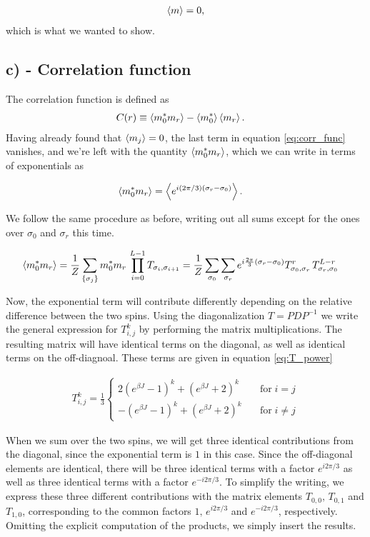 \documentclass[reprint,english,notitlepage,aps,nobalancelastpage,nofootinbib]{revtex4-1}
\newcommand{\sumstate}{\sum_{\{\sigma_j\}}}
\newcommand{\prodstate}{\prod_{i=0}^{L-1}}
\newcommand{\ebj}{e^{\beta J}}
\newcommand{\T}[1]{T_{\sigma_{#1},\sigma_{#1 + 1}}}
\newcommand{\mj}{m_j}
\begin{document}
\begin{align*}
	\expval{m} = 0,
\end{align*}
which is what we wanted to show.

\subsection*{c) - Correlation function}
The correlation function is defined as 
\begin{align} \label{eq:corr_func}
	C(r) &\equiv \expval{m_0^* m_r} - \expval{m_0^*}\expval{m_r}.
\end{align}
Having already found that $\expval{\mj}=0$, the last term in equation \eqref{eq:corr_func} vanishes, and we're left with the quantity $\expval{m_0^* m_r}$, which we can write in terms of exponentials as 

\begin{align*}
	\expval{m_0^* m_r} &= \expval{e^{i(2\pi/3)(\sigma_r - \sigma_0)}}.
\end{align*}

We follow the same procedure as before, writing out all sums except for the ones over $\sigma_0$ and $\sigma_r$ this time. 

\begin{align*}
	\expval{m_0^* m_r} &= \frac{1}{Z} \sumstate m_0^* m_r \, \prodstate \T{i} = \frac{1}{Z} \sum_{\sigma_0} \sum_{\sigma_r} e^{i\frac{2\pi}{3}(\sigma_r-\sigma_0)} T_{\sigma_0,\sigma_r}^{r} \, T_{\sigma_r,\sigma_0}^{L-r} 
\end{align*}

Now, the exponential term will contribute differently depending on the relative difference between the two spins. Using the diagonalization $T=PDP^{-1}$ we write the general expression for $T_{i,j}^k$ by performing the matrix multiplications. The resulting matrix will have identical terms on the diagonal, as well as identical terms on the off-diagnoal. These terms are given in equation \eqref{eq:T_power}  

\begin{align} \label{eq:T_power}
	T_{i,j}^k = \frac{1}{3}\begin{cases}
		2(\ebj-1)^k + (\ebj+2)^k \quad &\mathrm{for}\; i=j \\ 
		-(\ebj-1)^k + (\ebj+2)^k \quad &\mathrm{for}\; i\neq j
	\end{cases}
\end{align}

When we sum over the two spins, we will get three identical contributions from the diagonal, since the exponential term is $1$ in this case. Since the off-diagonal elements are identical, there will be three identical terms with a factor $e^{i2\pi/3}$ as well as three identical terms with a factor $e^{-i2\pi/3}$. To simplify the writing, we express these three different contributions with the matrix elements $T_{0,0},\,T_{0,1}$ and $T_{1,0}$, corresponding to the common factors $1,\,e^{i2\pi/3}$ and $e^{-i2\pi/3}$, respectively. Omitting the explicit computation of the products, we simply insert the results.  
\end{document}

